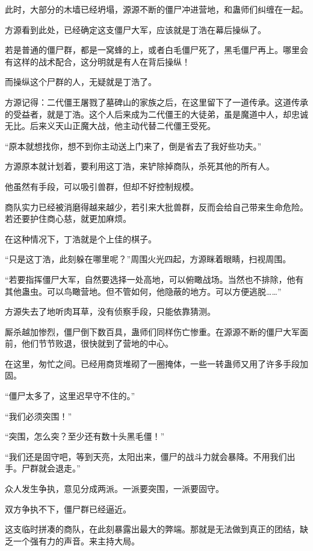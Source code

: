 
\begin{this_body}

此时，大部分的木墙已经坍塌，源源不断的僵尸冲进营地，和蛊师们纠缠在一起。

方源看到此处，已经确定这支僵尸大军，应该就是丁浩在幕后操纵了。

若是普通的僵尸群，都是一窝蜂的上，或者白毛僵尸死了，黑毛僵尸再上。哪里会有这样的战术配合，这分明就是有人在背后操纵！

而操纵这个尸群的人，无疑就是丁浩了。

方源记得：二代僵王屠戮了墓碑山的家族之后，在这里留下了一道传承。这道传承的受益者，就是丁浩。这个人后来成为二代僵王的大徒弟，虽是魔道中人，却忠诚无比。后来义天山正魔大战，他主动代替二代僵王受死。

“原本就想找你，想不到你主动送上门来了，倒是省去了我好些功夫。”

方源原本就计划着，要利用这丁浩，来铲除掉商队，杀死其他的所有人。

他虽然有手段，可以吸引兽群，但却不好控制规模。

商队实力已经被消磨得越来越少，若引来大批兽群，反而会给自己带来生命危险。若还要护住商心慈，就更加麻烦。

在这种情况下，丁浩就是个上佳的棋子。

“只是这丁浩，此刻躲在哪里呢？”周围火光四起，方源眯着眼睛，扫视周围。

“若要指挥僵尸大军，自然要选择一处高地，可以俯瞰战场。当然也不排除，他有其他蛊虫。可以鸟瞰营地。但不管如何，他隐蔽的地方。可以方便逃脱……”

方源失去了地听肉耳草，没有侦察手段，只能依靠猜测。

厮杀越加惨烈，僵尸倒下数百具，蛊师们同样伤亡惨重。在源源不断的僵尸大军面前，他们节节败退，很快就到了营地的中心。

在这里，匆忙之间。已经用商货堆砌了一圈掩体，一些一转蛊师又用了许多手段加固。

“僵尸太多了，这里迟早守不住的。”

“我们必须突围！”

“突围，怎么突？至少还有数十头黑毛僵！”

“我们还是固守吧，等到天亮，太阳出来，僵尸的战斗力就会暴降。不用我们出手。尸群就会退走。”

众人发生争执，意见分成两派。一派要突围，一派要固守。

双方争执不下，僵尸群已经逼近。

这支临时拼凑的商队，在此刻暴露出最大的弊端。那就是无法做到真正的团结，缺乏一个强有力的声音。来主持大局。


\end{this_body}
